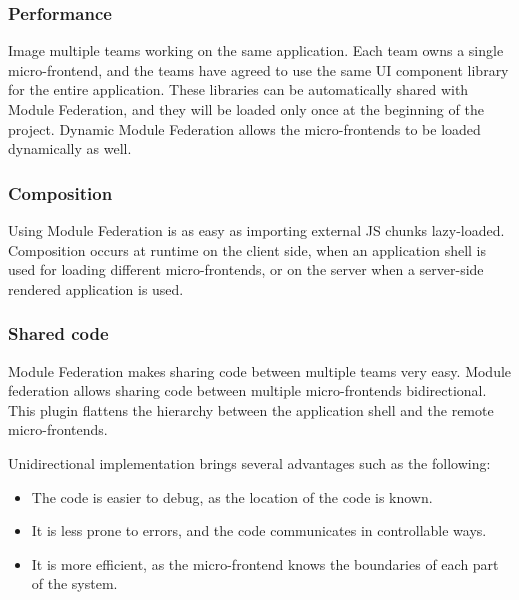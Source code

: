 \subsubsection{Performance}\label{subsubsection:background:micro-frontend:module-federation:performance}

Image multiple teams working on the same application. Each team owns a single micro-frontend, and the teams have agreed to use the same \ac{UI} component library for the entire application. These libraries can be automatically shared with Module Federation, and they will be loaded only once at the beginning of the project. Dynamic Module Federation allows the micro-frontends to be loaded dynamically as well. \cite[83]{book:2021:mezzalira:applied-methods:building-micro-frontends}

\subsubsection{Composition}\label{subsubsection:background:micro-frontend:module-federation:composition}

Using Module Federation is as easy as importing external \ac{JS} chunks lazy-loaded. Composition occurs at runtime on the client side, when an application shell is used for loading different micro-frontends, or on the server when a server-side rendered application is used. \cite[84]{book:2021:mezzalira:applied-methods:building-micro-frontends}

\subsubsection{Shared code}\label{subsubsection:background:micro-frontend:module-federation:shared-code}

Module Federation makes sharing code between multiple teams very easy. Module federation allows sharing code between multiple micro-frontends bidirectional. This plugin flattens the hierarchy between the application shell and the remote micro-frontends.

\noindent Unidirectional implementation brings several advantages such as the following: \cite[84]{book:2021:mezzalira:applied-methods:building-micro-frontends}

\begin{itemize}
    \item The code is easier to debug, as the location of the code is known.
    \item It is less prone to errors, and the code communicates in controllable ways.
    \item It is more efficient, as the micro-frontend knows the boundaries of each part of the system.
\end{itemize}

